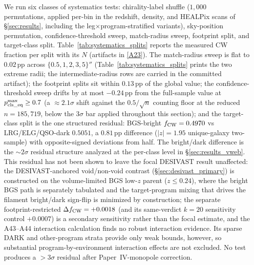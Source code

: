 \documentclass[twocolumn,linenumbers]{aastex702}
\newcommand{\repoBase}{https://github.com/Hubify-Projects/bigbounce/blob/main}
\begin{document}
We run six classes of systematics tests:
chirality-label shuffle ($1{,}000$ permutations, applied per-bin in
the redshift, density, and HEALPix scans of
\S\ref{sec:results}, including the leg$\times$program-stratified
variants), sky-position
permutation, confidence-threshold sweep, match-radius sweep,
footprint split, and target-class split.
Table~\ref{tab:systematics_splits} reports the measured CW fraction
per split with its $N$ (artifacts in
\href{\repoBase/pipelines/p5\_desi\_chirality/results/analysis\_systematics/}{[A23]}).
The match-radius sweep is flat to $0.02$\,pp across
$\{0.5, 1, 2, 3, 5\}''$
(Table~\ref{tab:systematics_splits} prints the two extreme radii;
the intermediate-radius rows are carried in the committed artifact);
the footprint splits sit within $0.13$\,pp
of the global value; the confidence-threshold sweep drifts by at most
$-0.24$\,pp from the full-sample value at
$p_{\rm cls\_eq}^{\max} \ge 0.7$ (a ${\approx}2.1\sigma$ shift
against the $0.5/\sqrt{n}$ counting floor at the reduced
$n = 185{,}719$, below the $3\sigma$ bar applied throughout this
section); and the target-class split is the one structured
residual: BGS-bright $f_{\rm CW} = 0.4970$ vs LRG/ELG/QSO-dark
$0.5051$, a $0.81$\,pp difference ($|z| = 1.95$ unique-galaxy two-sample) with
opposite-signed deviations from half. The bright/dark
difference is the $\sim\!2\sigma$ residual structure analyzed at the
per-class level in \S\ref{sec:results_vweb}. This residual has not been
shown to leave the focal DESIVAST result unaffected: the DESIVAST-anchored
void/non-void contrast (\S\ref{sec:desivast_primary}) is constructed
on the volume-limited BGS low-$z$ parent ($z \leq 0.24$), where the
bright BGS path is separately tabulated and the target-program mixing
that drives the filament bright/dark sign-flip is minimized by
construction; the separate footprint-restricted
$\Delta f_{\rm CW} = +0.0018$ (and its same-verdict $k\!=\!20$
sensitivity control $+0.0007$) is a secondary sensitivity rather than
the focal estimate, and the A43--A44 interaction calculation finds no robust
interaction evidence. Its sparse DARK and other-program strata provide only
weak bounds, however, so substantial program-by-environment interaction effects
are not excluded. No test produces a
$>3\sigma$ residual after
Paper~IV-monopole correction.
\end{document}

